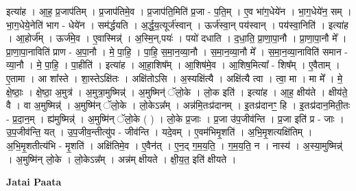 \documentclass[17pt]{extarticle}
\begin{document}
इत्या॑ह । आ॒ह॒ प्र॒जाप॑तिम् । प्र॒जाप॑तिमे॒व । प्र॒जाप॑ति॒मिति॑ प्र॒जा - प॒ति॒म् । ए॒व भा॑ग॒धेये॑न । भा॒ग॒धेये॑न॒ सम् । भा॒ग॒धेये॒नेति॑ भाग - धेये॑न । सम॑र्द्धयति । अ॒र्द्ध॒य॒त्यूर्ज॑स्वान् । ऊर्ज॑स्वा॒न् पय॑स्वान् । पय॑स्वा॒निति॑ । इत्या॑ह । आ॒होर्ज᳚म् । ऊर्ज॑मे॒व । ए॒वास्मिन्न्॑ । अ॒स्मि॒न्,पयः॑ । पयो॑ दधाति । द॒धा॒ति॒ प्रा॒णा॒पा॒नौ । प्रा॒णा॒पा॒नौ मे᳚ । प्रा॒णा॒पा॒नाविति॑ प्राण - अ॒पा॒नौ । मे॒ पा॒हि॒ । पा॒हि॒ स॒मा॒न॒व्या॒नौ । स॒मा॒न॒व्या॒नौ मे᳚ । स॒मा॒न॒व्या॒नाविति॑ समान - व्या॒नौ । मे॒ पा॒हि॒ । पा॒हीति॑ । इत्या॑ह । आ॒हा॒शिष᳚म् । आ॒शिष॑मे॒व । आ॒शिष॒मित्या᳚ - शिष᳚म् । ए॒वैताम् । ए॒तामा । आ शा᳚स्ते । शा॒स्तेऽक्षि॑तः । अक्षि॑तोऽसि । अ॒स्यक्षि॑त्यै । अक्षि॑त्यै त्वा । त्वा॒ मा । मा मे᳚ । मे॒ क्षे॒ष्ठाः॒ । क्षे॒ष्ठा॒ अ॒मुत्र॑ । अ॒मुत्रा॒मुष्मिन्न्॑ । अ॒मुष्मिन्॑ ॅलो॒के । लो॒क इति॑ । इत्या॑ह । आ॒ह॒ क्षीय॑ते । क्षीय॑ते॒ वै । वा अ॒मुष्मिन्न्॑ । अ॒मुष्मि॑न् ॅलो॒के । लो॒केऽन्न᳚म् । अन्न॑मि॒तःप्र॑दानम् । इ॒तःप्र॑दानꣳ॒॒ हि । इ॒तःप्र॑दान॒मिती॒तः - प्र॒दा॒न॒म् । ह्य॑मुष्मिन्न्॑ । अ॒मुष्मि॑न् ॅलो॒के ( ) । लो॒के प्र॒जाः । प्र॒जा उ॑प॒जीव॑न्ति । प्र॒जा इति॑ प्र - जाः । उ॒प॒जीव॑न्ति॒ यत् । उ॒प॒जीव॒न्तीत्यु॑प - जीव॑न्ति । यदे॒वम् । ए॒वम॑भिमृ॒शति॑ । अ॒भि॒मृ॒शत्यक्षि॑तिम् । अ॒भि॒मृ॒शतीत्य॑भि - मृ॒शति॑ । अक्षि॑तिमे॒व । ए॒वैन॑त् । ए॒न॒द् ग॒म॒य॒ति॒ । ग॒म॒य॒ति॒ न । नास्य॑ । अ॒स्या॒मुष्मिन्न्॑ । अ॒मुष्मि॑न् लो॒के । लो॒केऽन्न᳚म् । अन्न॑म् क्षीयते । क्षी॒य॒त॒ इति॑ क्षीयते । \newline

\textbf{Jatai Paata} \newline
\end{document}
